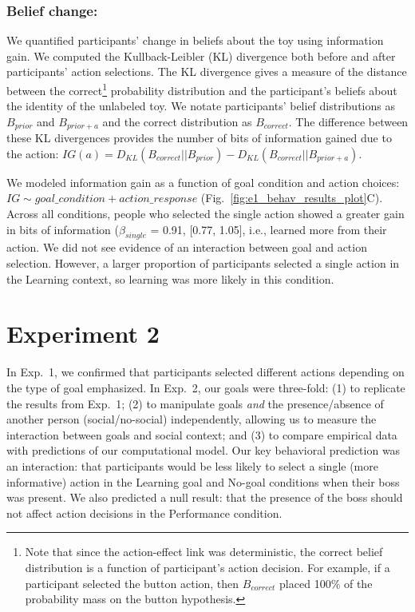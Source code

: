 \documentclass[10pt, letterpaper]{article}
\begin{document}
\hypertarget{belief-change}{%
\subsubsection{Belief change:}\label{belief-change}}

We quantified participants' change in beliefs about the toy using
information gain. We computed the Kullback-Leibler (KL) divergence both
before and after participants' action selections. The KL divergence
gives a measure of the distance between the correct\footnote{Note that
  since the action-effect link was deterministic, the correct belief
  distribution is a function of participant's action decision. For
  example, if a participant selected the button action, then
  \(B_{correct}\) placed 100\% of the probability mass on the button
  hypothesis.} probability distribution and the participant's beliefs
about the identity of the unlabeled toy. We notate participants' belief
distributions as \(B_{prior}\) and \(B_{prior+a}\) and the correct
distribution as \(B_{correct}\). The difference between these KL
divergences provides the number of bits of information gained due to the
action:
\(IG(a) = D_{KL} ( B_{correct}|| B_{prior} ) - D_{KL} (B_{correct} || B_{prior+a} )\).

We modeled information gain as a function of goal condition and action
choices: \texttt{$IG \sim goal\_condition + action\_response$}
(Fig.~\ref{fig:e1_behav_results_plot}C). Across all conditions, people
who selected the single action showed a greater gain in bits of
information (\(\beta_{single}\) = 0.91, {[}0.77, 1.05{]}, i.e., learned
more from their action. We did not see evidence of an interaction
between goal and action selection. However, a larger proportion of
participants selected a single action in the Learning context, so
learning was more likely in this condition.

\hypertarget{experiment-2}{%
\section{Experiment 2}\label{experiment-2}}

In Exp.~1, we confirmed that participants selected different actions
depending on the type of goal emphasized. In Exp.~2, our goals were
three-fold: (1) to replicate the results from Exp.~1; (2) to manipulate
goals \emph{and} the presence/absence of another person
(social/no-social) independently, allowing us to measure the interaction
between goals and social context; and (3) to compare empirical data with
predictions of our computational model. Our key behavioral prediction
was an interaction: that participants would be less likely to select a
single (more informative) action in the Learning goal and No-goal
conditions when their boss was present. We also predicted a null result:
that the presence of the boss should not affect action decisions in the
Performance condition.
\end{document}
